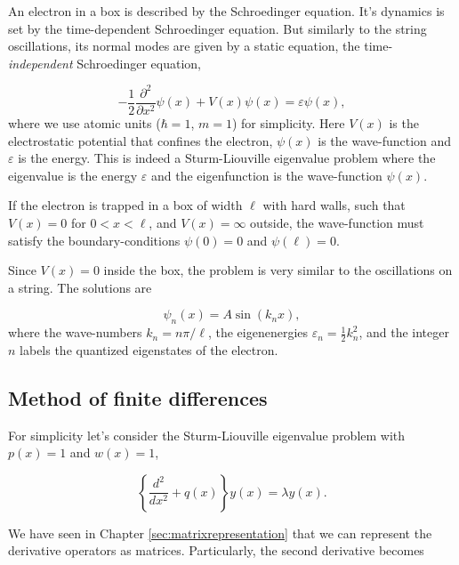 An electron in a box is described by the Schroedinger equation. It's dynamics is set by the time-dependent Schroedinger equation. But similarly to the string oscillations, its normal modes are given by a static equation, the time-\textit{independent} Schroedinger equation,

\begin{equation}
 -\dfrac{1}{2}\dfrac{\partial^2}{\partial x^2} \psi(x) + V(x) \psi(x) = \varepsilon \psi(x),
 \label{eq:Schroedinger}
\end{equation}
where we use atomic units ($\hbar = 1$, $m=1$) for simplicity. Here $V(x)$ is the electrostatic potential that confines the electron, $\psi(x)$ is the wave-function and $\varepsilon$ is the energy. This is indeed a Sturm-Liouville eigenvalue problem where the eigenvalue is the energy $\varepsilon$ and the eigenfunction is the wave-function $\psi(x)$.

If the electron is trapped in a box of width $\ell$ with hard walls, such that $V(x) = 0$ for $0 < x < \ell$, and $V(x) = \infty$ outside, the wave-function must satisfy the boundary-conditions $\psi(0) = 0$ and $\psi(\ell) = 0$.

Since $V(x) = 0$ inside the box, the problem is very similar to the oscillations on a string. The solutions are

\begin{equation}
 \psi_n(x) = A \sin(k_n x),
 \label{eq:psin}
\end{equation}
where the wave-numbers $k_n = n\pi/\ell$, the eigenenergies $\varepsilon_n = \frac{1}{2}k_n^2$, and the integer $n$ labels the quantized eigenstates of the electron.

\subsection{Method of finite differences}

For simplicity let's consider the Sturm-Liouville eigenvalue problem with $p(x) = 1$ and $w(x) = 1$,

\begin{equation}
 \left\{\dfrac{d^2}{dx^2} + q(x)\right\}y(x) = \lambda y(x).
\end{equation}

We have seen in Chapter \ref{sec:matrixrepresentation} that we can represent the derivative operators as matrices. Particularly, the second derivative becomes

